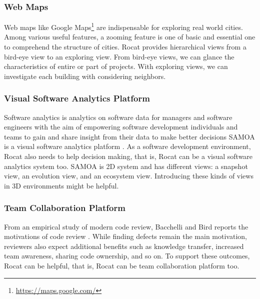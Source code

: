 \documentclass[conference]{IEEEtran}
\begin{document}
\subsubsection{Web Maps}
Web maps like Google Maps\footnote{\url{https://maps.google.com/}} are indispensable for exploring real world cities.
Among various useful features, a zooming feature is one of basic and essential one to comprehend the structure of cities.
Rocat provides hierarchical views from a bird-eye view to an exploring view.
From bird-eye views, we can glance the characteristics of entire or part of projects.
With exploring views, we can investigate each building with considering neighbors.

\subsubsection{Visual Software Analytics Platform}
Software analytics is analytics on software data for managers and software engineers with the aim of empowering software development individuals and teams to gain and share insight from their data to make better decisions \cite{Menzies:2013:SAS:2553351.2553360} SAMOA is a visual software analytics platform \cite{6676936}.
As a software development environment, Rocat also needs to help decision making, that is, Rocat can be a visual software analytics system too.
SAMOA is 2D system and has different views: a snapshot view, an evolution view, and an ecosystem view.
Introducing these kinds of views in 3D environments might be helpful.

\subsubsection{Team Collaboration Platform}
From an empirical study of modern code review, Bacchelli and Bird reports the motivations of code review \cite{Bacchelli:2013:EOC:2486788.2486882}. While finding defects remain the main motivation, reviewers also expect additional benefits such as knowledge transfer, increased team awareness, sharing code ownership, and so on.
To support these outcomes, Rocat can be helpful, that is, Rocat can be team collaboration platform too.
\end{document}
